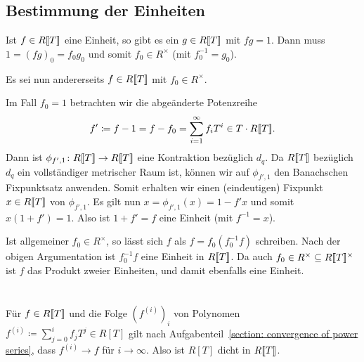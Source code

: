 \documentclass[a4paper, 10pt, numbers=noenddot]{scrartcl}
\begin{document}
\subsection*{Bestimmung der Einheiten}

Ist $f \in R[\![T]\!]$ eine Einheit, so gibt es ein $g \in R[\![T]\!]$ mit $fg = 1$.
Dann muss $1 = (fg)_0 = f_0 g_0$ und somit $f_0 \in R^\times$ (mit $f_0^{-1} = g_0$).

Es sei nun andererseits $f \in R[\![T]\!]$ mit $f_0 \in R^\times$.

Im Fall $f_0 = 1$ betrachten wir die abgeänderte Potenzreihe
\[
            f'         
  \coloneqq f - 1
  =         f - f_0
  =         \sum_{i=1}^\infty f_i T^i
  \in       T \cdot R[\![T]\!].
\]
Dann ist $\phi_{f', 1} \colon R[\![T]\!] \to R[\![T]\!]$ eine Kontraktion bezüglich $d_q$.
Da $R[\![T]\!]$ bezüglich $d_q$ ein vollständiger metrischer Raum ist, können wir auf $\phi_{f',1}$ den Banachschen Fixpunktsatz anwenden.
Somit erhalten wir einen (eindeutigen) Fixpunkt $x \in R[\![T]\!]$ von $\phi_{f',1}$.
Es gilt nun $x = \phi_{f',1}(x) = 1 - f' x$ und somit $x (1 + f') = 1$.
Also ist $1 + f' = f$ eine Einheit (mit $f^{-1} = x$).

Ist allgemeiner $f_0 \in R^\times$, so lässt sich $f$ als $f = f_0 (f_0^{-1} f)$ schreiben.
Nach der obigen Argumentation ist $f_0^{-1} f$ eine Einheit in $R[\![T]\!]$.
Da auch $f_0 \in R^\times \subseteq R[\![T]\!]^\times$ ist $f$ das Produkt zweier Einheiten, und damit ebenfalls eine Einheit.





\section{}


Für $f \in R[\![T]\!]$ und die Folge $(f^{(i)})_i$ von Polynomen $f^{(i)} \coloneqq \sum_{j=0}^i f_j T^j \in R[T]$ gilt nach Aufgabenteil~\ref{section: convergence of power series}, dass $f^{(i)} \to f$ für $i \to \infty$.
Also ist $R[T]$ dicht in $R[\![T]\!]$.





\section{}
\end{document}
